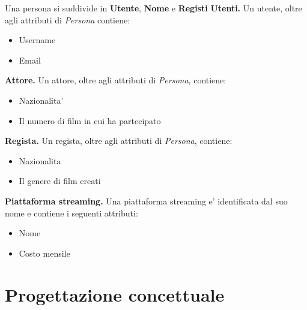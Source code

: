 \documentclass[12pt,a4paper]{article}
\begin{document}
Una persona si suddivide in \textbf{Utente}, \textbf{Nome} e \textbf{Registi}\newpage
\textbf{Utenti.} Un utente, oltre agli attributi di \textit{Persona} contiene:
\begin{itemize}
    \item Username
    \item Email
\end{itemize}
\textbf{Attore.} Un attore, oltre agli attributi di \textit{Persona}, contiene:
\begin{itemize}
    \item Nazionalita'
    \item Il numero di film in cui ha partecipato
\end{itemize}
\textbf{Regista.} Un regista, oltre agli attributi di \textit{Persona}, contiene:
\begin{itemize}
    \item Nazionalita
    \item Il genere di film creati
\end{itemize}
\textbf{Piattaforma streaming.} Una piattaforma streaming e' identificata dal suo nome e contiene i seguenti attributi:
\begin{itemize}
    \item Nome 
    \item Costo mensile
\end{itemize}
\section{Progettazione concettuale}
\end{document}
